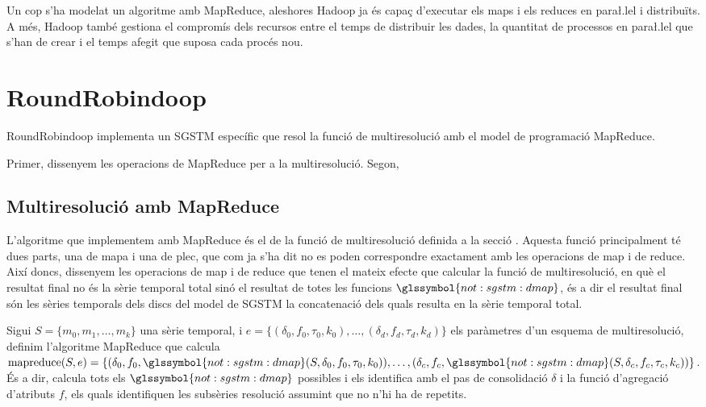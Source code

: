 Un cop s'ha modelat un algoritme amb MapReduce, aleshores Hadoop ja és
capaç d'executar els maps i els reduces en para\l.lel i distribuïts. A
més, Hadoop també gestiona el compromís dels recursos entre el temps
de distribuir les dades, la quantitat de processos en para\l.lel que
s'han de crear i el temps afegit que suposa cada procés nou.








\section{RoundRobindoop}


\todo{}

RoundRobindoop implementa un \gls{SGSTM} específic que resol la funció
de multiresolució amb el model de programació MapReduce. 

Primer, dissenyem les operacions de MapReduce per a la multiresolució. Segon, 



\subsection{Multiresolució amb MapReduce}

L'algoritme que implementem amb MapReduce és el de la funció de
multiresolució definida a la secció . Aquesta funció principalment té dues
parts, una de mapa i una de plec, que com ja s'ha dit no es poden
correspondre exactament amb les operacions de map i de reduce. 
 Així
doncs, dissenyem les operacions de map i de reduce que tenen el mateix
efecte que calcular la funció de multiresolució, en què el resultat
final no és la sèrie temporal total sinó el resultat de totes les
funcions $\glssymbol{not:sgstm:dmap}$, és a dir el resultat final són
les sèries temporals dels discs del model de \gls{SGSTM} la
concatenació dels quals resulta en la sèrie temporal total.



Sigui $S=\{m_0,m_1,\dotsc,m_k\}$ una sèrie temporal, i $e = \{
(\delta_0,f_0,\tau_0,k_0),\ldots, (\delta_d,f_d,\tau_d,k_d)\}$ els
paràmetres d'un esquema de multiresolució, definim l'algoritme
MapReduce que calcula $\operatorname{mapreduce}(S,e) = \{
(\delta_0,f_0,
\glssymbol{not:sgstm:dmap}(S,\delta_0,f_0,\tau_0,k_0)),\dotsc,
(\delta_c,f_c,\glssymbol{not:sgstm:dmap}(S,\delta_c,f_c,\tau_c,k_c))
\}$. És a dir, calcula tots els $\glssymbol{not:sgstm:dmap}$ possibles
i els identifica amb el pas de consolidació $\delta$ i la funció
d'agregació d'atributs $f$, els quals identifiquen les subsèries
resolució assumint que no n'hi ha de repetits.





